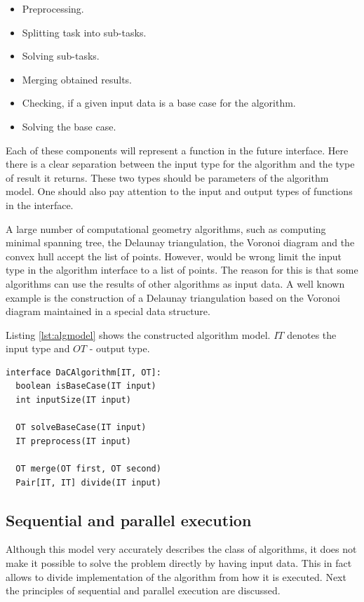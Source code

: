 \documentclass[twoside,twocolumn,10pt]{article}
\begin{document}
		\begin{itemize}
			\item
			Preprocessing.
			\item
			Splitting task into sub-tasks.
			\item
			Solving sub-tasks.
			\item
			Merging obtained results.
			\item
			Checking, if a given input data is a base case for the algorithm.
			\item
			Solving the base case.
		\end{itemize}

		Each of these components will represent a function in the future interface. Here there is a clear separation between the input type for the algorithm and the type of result it returns. These two types should be parameters of the algorithm model. One should also pay attention to the input and output types of functions  in the interface.

		A large number of computational geometry algorithms, such as computing minimal spanning tree, the Delaunay triangulation, the Voronoi diagram and the convex hull accept the list of points. However, would be wrong limit the input type in the algorithm interface to a list of points. The reason for this is that some algorithms can use the results of other algorithms as input data. A well known example is the construction of a Delaunay triangulation based on the Voronoi diagram maintained in a special data structure.

		Listing \ref{lst:algmodel} shows the constructed algorithm model. $IT$ denotes the input type and $OT$ - output type.

		\begin{lstlisting}[caption={Algorithm model based on the ``divide-and-conquer'' principle},label={lst:algmodel},captionpos=b]
interface DaCAlgorithm[IT, OT]:
  boolean isBaseCase(IT input)
  int inputSize(IT input)
  
  OT solveBaseCase(IT input)
  IT preprocess(IT input)
  
  OT merge(OT first, OT second)
  Pair[IT, IT] divide(IT input)

		\end{lstlisting}

\subsection{Sequential and parallel execution}
		Although this model very accurately describes the class of algorithms, it does not make it possible to solve the problem directly by having input data. This in fact allows to divide implementation of the algorithm from how it is executed. Next the principles of sequential and parallel execution are discussed.
\end{document}
